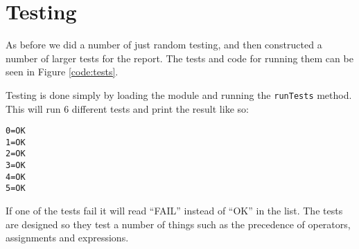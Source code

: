 \section{Testing}

As before we did a number of just random testing, and then constructed a number
of larger tests for the report. The tests and code for running them can be seen
in Figure \ref{code:tests}.


Testing is done simply by loading the module and running the \texttt{runTests}
method. This will run 6 different tests and print the result like so:
\begin{verbatim}
0=OK
1=OK
2=OK
3=OK
4=OK
5=OK
\end{verbatim}

If one of the tests fail it will read ``FAIL'' instead of ``OK'' in the list.
The tests are designed so they test a number of things such as the precedence of
operators, assignments and expressions.

